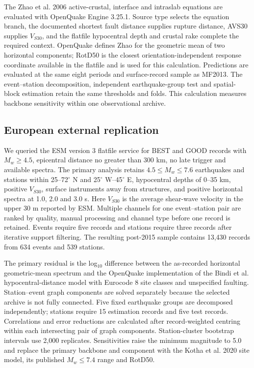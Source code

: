 \documentclass[11pt]{article}
\begin{document}
The Zhao et al. 2006 active-crustal, interface and intraslab equations are evaluated with OpenQuake Engine 3.25.1\cite{zhao2006,pagani2014}. Source type selects the equation branch, the documented shortest fault distance supplies rupture distance, AVS30 supplies $V_{S30}$, and the flatfile hypocentral depth and crustal rake complete the required context. OpenQuake defines Zhao for the geometric mean of two horizontal components; RotD50 is the closest orientation-independent response coordinate available in the flatfile and is used for this calculation. Predictions are evaluated at the same eight periods and surface-record sample as MF2013. The event--station decomposition, independent earthquake-group test and spatial-block estimation retain the same thresholds and folds. This calculation measures backbone sensitivity within one observational archive.

\subsection{European external replication}

We queried the ESM version 3 flatfile service for BEST and GOOD records with $M_w\geq4.5$, epicentral distance no greater than 300 km, no late trigger and available spectra\cite{esm2026}. The primary analysis retains $4.5\leq M_w\leq7.6$ earthquakes and stations within 25--72$^\circ$ N and 25$^\circ$ W--45$^\circ$ E, hypocentral depths of 0--35 km, positive $V_{S30}$, surface instruments away from structures, and positive horizontal spectra at 1.0, 2.0 and 3.0 s. Here $V_{S30}$ is the average shear-wave velocity in the upper 30 m reported by ESM. Multiple channels for one event--station pair are ranked by quality, manual processing and channel type before one record is retained. Events require five records and stations require three records after iterative support filtering. The resulting post-2015 sample contains 13,430 records from 634 events and 539 stations.

The primary residual is the log$_{10}$ difference between the as-recorded horizontal geometric-mean spectrum and the OpenQuake implementation of the Bindi et al. hypocentral-distance model with Eurocode 8 site classes and unspecified faulting\cite{bindi2014}. Station--event graph components are solved separately because the selected archive is not fully connected. Five fixed earthquake groups are decomposed independently; stations require 15 estimation records and five test records. Correlations and error reductions are calculated after record-weighted centring within each intersecting pair of graph components. Station-cluster bootstrap intervals use 2,000 replicates. Sensitivities raise the minimum magnitude to 5.0 and replace the primary backbone and component with the Kotha et al. 2020 site model, its published $M_w\leq7.4$ range and RotD50\cite{kotha2020}.
\end{document}
